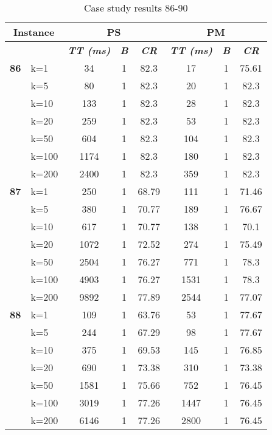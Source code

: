     \begin{table}[htbp]
    \caption{Case study results 86-90}
    \centering
    \begin{tabular}{|l|l|c|c|c|c|c|c|}
    \hline
    \multicolumn{ 2}{|c|}{\textbf{Instance}} & \multicolumn{ 3}{c|}{\textbf{PS}} & \multicolumn{ 3}{c|}{\textbf{PM}} \\ \hline
    \multicolumn{ 2}{|l|}{} & \textbf{\textit{TT (ms)}} & \textbf{\textit{B}} & \textbf{\textit{CR}} & \textbf{\textit{TT (ms)}} & \textbf{\textit{B}} & \textbf{\textit{CR}} \\ \hline
    \multicolumn{1}{|r|}{\textbf{86}} & k=1 & 34 & 1 & 82.3 & 17 & 1 & 75.61 \\ 
     & k=5 & 80 & 1 & 82.3 & 20 & 1 & 82.3 \\ 
     & k=10 & 133 & 1 & 82.3 & 28 & 1 & 82.3 \\ 
     & k=20 & 259 & 1 & 82.3 & 53 & 1 & 82.3 \\ 
     & k=50 & 604 & 1 & 82.3 & 104 & 1 & 82.3 \\ 
     & k=100 & 1174 & 1 & 82.3 & 180 & 1 & 82.3 \\ 
     & k=200 & 2400 & 1 & 82.3 & 359 & 1 & 82.3 \\ \hline
    \multicolumn{1}{|r|}{\textbf{87}} & k=1 & 250 & 1 & 68.79 & 111 & 1 & 71.46 \\ 
     & k=5 & 380 & 1 & 70.77 & 189 & 1 & 76.67 \\ 
     & k=10 & 617 & 1 & 70.77 & 138 & 1 & 70.1 \\ 
     & k=20 & 1072 & 1 & 72.52 & 274 & 1 & 75.49 \\ 
     & k=50 & 2504 & 1 & 76.27 & 771 & 1 & 78.3 \\ 
     & k=100 & 4903 & 1 & 76.27 & 1531 & 1 & 78.3 \\ 
     & k=200 & 9892 & 1 & 77.89 & 2544 & 1 & 77.07 \\ \hline
    \multicolumn{1}{|r|}{\textbf{88}} & k=1 & 109 & 1 & 63.76 & 53 & 1 & 77.67 \\ 
     & k=5 & 244 & 1 & 67.29 & 98 & 1 & 77.67 \\ 
     & k=10 & 375 & 1 & 69.53 & 145 & 1 & 76.85 \\ 
     & k=20 & 690 & 1 & 73.38 & 310 & 1 & 73.38 \\ 
     & k=50 & 1581 & 1 & 75.66 & 752 & 1 & 76.45 \\ 
     & k=100 & 3019 & 1 & 77.26 & 1447 & 1 & 76.45 \\ 
     & k=200 & 6146 & 1 & 77.26 & 2800 & 1 & 76.45 \\ \hline

\end{tabular}
\end{table}

